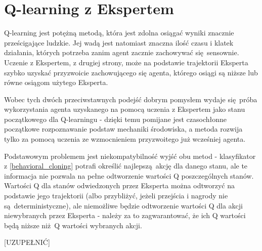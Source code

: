 \section{Q-learning z Ekspertem}
Q-learning jest potężną metodą, która jest zdolna osiągać wyniki znacznie prześcigające ludzkie. Jej wadą jest natomiast znaczna ilość czasu i klatek działania, których potrzeba zanim agent zacznie zachowywać się sensownie. Uczenie z Ekspertem, z drugiej strony, może na podstawie trajektorii Eksperta szybko uzyskać przyzwoicie zachowującego się agenta, którego osiągi są niższe lub równe osiągom użytego Eksperta.

Wobec tych dwóch przeciwstawnych podejść dobrym pomysłem wydaje się próba wykorzystania agenta uzyskanego na pomocą uczenia z Ekspertem jako stanu początkowego dla Q-learningu - dzięki temu pomijane jest czasochłonne początkowe rozpoznawanie podstaw mechaniki środowiska, a metoda rozwija tylko za pomocą uczenia ze wzmocnieniem przyzwoitego już wcześniej agenta.

Podstawowym problemem jest niekompatybilność wyjść obu metod - klasyfikator z \ref{behavioral_cloning} potrafi określić najlepszą akcję dla danego stanu, ale te informacja nie pozwala na pełne odtworzenie wartości Q poszczególnych stanów. Wartości Q dla stanów odwiedzonych przez Eksperta można odtworzyć na podstawie jego trajektorii (albo przybliżyć, jeżeli przejścia i nagrody nie są deterministyczne), ale niemożliwe będzie odtworzenie wartości Q dla akcji niewybranych przez Eksperta - należy za to zagwarantować, że ich Q wartości będą niższe niż Q wartości wybranych akcji.

[UZUPEŁNIĆ]

